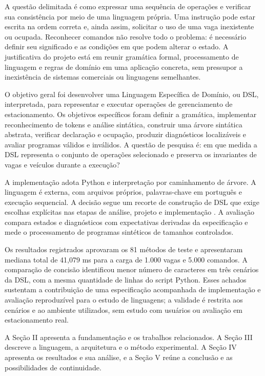 \documentclass[conference,a4paper]{IEEEtran}
\begin{document}
A questão delimitada é como expressar uma sequência de operações e verificar sua consistência por meio de uma linguagem própria. Uma instrução pode estar escrita na ordem correta e, ainda assim, solicitar o uso de uma vaga inexistente ou ocupada. Reconhecer comandos não resolve todo o problema: é necessário definir seu significado e as condições em que podem alterar o estado. A justificativa do projeto está em reunir gramática formal, processamento de linguagem e regras de domínio em uma aplicação concreta, sem pressupor a inexistência de sistemas comerciais ou linguagens semelhantes.


O objetivo geral foi desenvolver uma Linguagem Específica de Domínio, ou DSL, interpretada, para representar e executar operações de gerenciamento de estacionamento. Os objetivos específicos foram definir a gramática, implementar reconhecimento de tokens e análise sintática, construir uma árvore sintática abstrata, verificar declaração e ocupação, produzir diagnósticos localizáveis e avaliar programas válidos e inválidos. A questão de pesquisa é: em que medida a DSL representa o conjunto de operações selecionado e preserva os invariantes de vagas e veículos durante a execução?


A implementação adota Python e interpretação por caminhamento de árvore. A linguagem é externa, com arquivos próprios, palavras-chave em português e execução sequencial. A decisão segue um recorte de construção de DSL que exige escolhas explícitas nas etapas de análise, projeto e implementação \cite{mernik2005}. A avaliação compara estados e diagnósticos com expectativas derivadas da especificação e mede o processamento de programas sintéticos de tamanhos controlados.


Os resultados registrados aprovaram os 81 métodos de teste e apresentaram mediana total de 41,079 ms para a carga de 1.000 vagas e 5.000 comandos. A comparação de concisão identificou menor número de caracteres em três cenários da DSL, com a mesma quantidade de linhas do script Python. Esses achados sustentam a contribuição de uma especificação acompanhada de implementação e avaliação reproduzível para o estudo de linguagens; a validade é restrita aos cenários e ao ambiente utilizados, sem estudo com usuários ou avaliação em estacionamento real.


A Seção II apresenta a fundamentação e os trabalhos relacionados. A Seção III descreve a linguagem, a arquitetura e o método experimental. A Seção IV apresenta os resultados e sua análise, e a Seção V reúne a conclusão e as possibilidades de continuidade.
\end{document}
